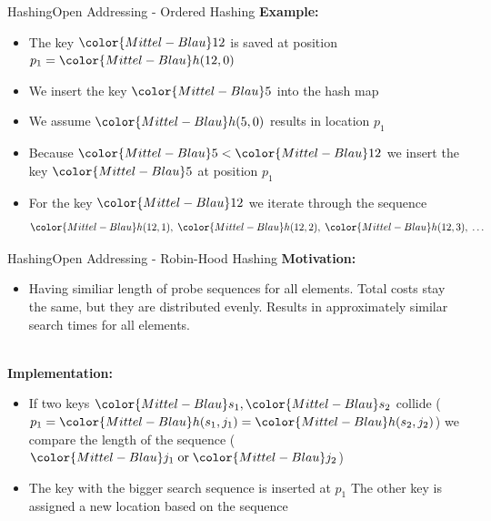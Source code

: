 
\begin{frame}{Hashing}{Open Addressing - Ordered Hashing}
  \textbf{Example:}
  \begin{itemize}
    \item
      The key ${\color{Mittel-Blau}12}$ is saved at position
      $p_1 = {\color{Mittel-Blau}h(12, 0)}$
    \item
      We insert the key ${\color{Mittel-Blau}5}$ into the hash map
    \item
      We assume ${\color{Mittel-Blau}h(5,0)}$ results in location $p_1$
    \item
      Because ${\color{Mittel-Blau}5} < {\color{Mittel-Blau}12}$ we insert
      the key ${\color{Mittel-Blau}5}$ at position $p_1$
    \item
      For the key ${\color{Mittel-Blau}12}$ we iterate through the sequence
      \begin{displaymath}
        {\color{Mittel-Blau}h(12, 1)} ,\;
        {\color{Mittel-Blau}h(12, 2)} ,\;
        {\color{Mittel-Blau}h(12, 3)} ,\;
        \dots
      \end{displaymath}
  \end{itemize}
\end{frame}


\begin{frame}{Hashing}{Open Addressing - Robin-Hood Hashing}
  \textbf{Motivation:}
  \begin{itemize}
    \item <2-> 
      Having similiar length of probe sequences for all elements.
      Total costs stay the same, but they are distributed evenly.
      Results in approximately similar search times for all elements.
  \end{itemize}
  \hfill\\[0.5em]
  \textbf{Implementation:}
  \begin{itemize}
    \item<4->
      If two keys ${\color{Mittel-Blau}s_1}, {\color{Mittel-Blau}s_2}$ collide
      (\begin{math}
        p_1 = {\color{Mittel-Blau}h(s_1, j_1)}
            = {\color{Mittel-Blau}h(s_2, j_2)}
      \end{math})
      we compare the length of the sequence
      (\begin{math}
        {\color{Mittel-Blau}j_1} \;\text{or}\; {\color{Mittel-Blau}j_2}
      \end{math})
    \item<5->
      The key with the bigger search sequence is inserted at $p_1$
      The other key is assigned a new location based on the sequence
  \end{itemize}
\end{frame}

